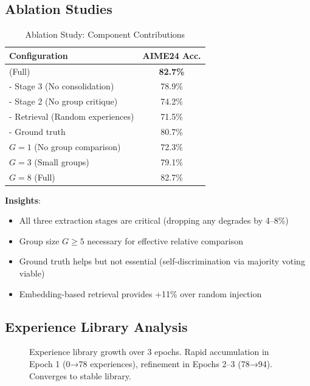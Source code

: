 \subsection{Ablation Studies}

\begin{table}[t]
\centering
\caption{Ablation Study: Component Contributions}
\label{tab:ablation}
\begin{tabular}{lc}
\toprule
\textbf{Configuration} & \textbf{AIME24 Acc.} \\
\midrule
\DSO{} (Full) & \textbf{82.7\%} \\
\quad - Stage 3 (No consolidation) & 78.9\% \\
\quad - Stage 2 (No group critique) & 74.2\% \\
\quad - Retrieval (Random experiences) & 71.5\% \\
\quad - Ground truth & 80.7\% \\
$G=1$ (No group comparison) & 72.3\% \\
$G=3$ (Small groups) & 79.1\% \\
$G=8$ (Full) & 82.7\% \\
\bottomrule
\end{tabular}
\end{table}

\textbf{Insights}:
\begin{itemize}
    \item All three extraction stages are critical (dropping any degrades by 4--8\%)
    \item Group size $G \geq 5$ necessary for effective relative comparison
    \item Ground truth helps but not essential (self-discrimination via majority voting viable)
    \item Embedding-based retrieval provides +11\% over random injection
\end{itemize}

\subsection{Experience Library Analysis}

\begin{figure}[t]
\centering
\caption{Experience library growth over 3 epochs. Rapid accumulation in Epoch 1 (0→78 experiences), refinement in Epochs 2--3 (78→94). Converges to stable library.}
\label{fig:growth}
\end{figure}

